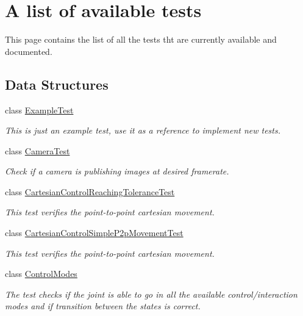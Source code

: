 \section{A list of available tests}
\label{group__icub-tests}


This page contains the list of all the tests tht are currently available and documented.  


\subsection*{Data Structures}
\begin{DoxyCompactItemize}
\item 
class \hyperlink{classExampleTest}{Example\+Test}
\begin{DoxyCompactList}\small\item\em This is just an example test, use it as a reference to implement new tests. \end{DoxyCompactList}\item 
class \hyperlink{classCameraTest}{Camera\+Test}
\begin{DoxyCompactList}\small\item\em Check if a camera is publishing images at desired framerate. \end{DoxyCompactList}\item 
class \hyperlink{classCartesianControlReachingToleranceTest}{Cartesian\+Control\+Reaching\+Tolerance\+Test}
\begin{DoxyCompactList}\small\item\em This test verifies the point-\/to-\/point cartesian movement. \end{DoxyCompactList}\item 
class \hyperlink{classCartesianControlSimpleP2pMovementTest}{Cartesian\+Control\+Simple\+P2p\+Movement\+Test}
\begin{DoxyCompactList}\small\item\em This test verifies the point-\/to-\/point cartesian movement. \end{DoxyCompactList}\item 
class \hyperlink{classControlModes}{Control\+Modes}
\begin{DoxyCompactList}\small\item\em The test checks if the joint is able to go in all the available control/interaction modes and if transition between the states is correct. \end{DoxyCompactList}\item 

\end{DoxyCompactItemize}
